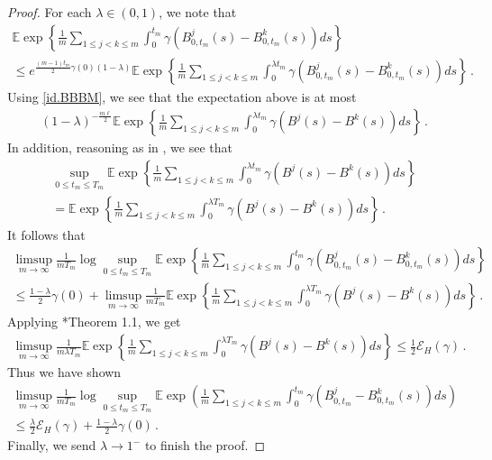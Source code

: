 \documentclass[12pt,reqno]{amsart}
\theoremstyle{remark}
\newcommand{\1}{\mathbf{1}}
\def\EE{\mathbb{E}}
\def\lt{\left}
\def\rt{\right}
\begin{document}
	\begin{proof}%
		For each $\lambda\in(0,1)$, we note that
		\begin{multline*}
			\EE \exp \left\{ \frac{1}{m} \sum_{1 \leq j < k \leq m} \int_0^{t_m} \gamma\left( B_{0, t_m}^j(s)-B_{0, t_m}^k(s) \right) ds \right\}
			\\\le
			e^{\frac{(m-1)t_m} 2\gamma(0)(1- \lambda)} \EE \exp \left\{ \frac{1}{m} \sum_{1 \leq j < k \leq m} \int_0^{\lambda t_m} \gamma\left( B_{0, t_m}^j(s)-B_{0, t_m}^k(s) \right) ds \right\}\,.
		\end{multline*}
		Using \eqref{id.BBBM}, we see that the expectation above is at most
		\begin{align*}
			(1- \lambda)^{-\frac{m\ell}2}\EE\exp\lt\{\frac1m\sum_{1\le j<k\le m}\int_0^{\lambda t_m}\gamma(B^j(s)-B^k(s))ds\rt\}\,.
		\end{align*}
		In addition, reasoning as in \cite[Lemma 4.1]{HLN15}, we see that
		\begin{multline*}
			\sup_{0 \leq t_m \leq T_m}\EE \exp \left\{ \frac{1}{m} \sum_{1 \leq j < k \leq m} \int_0^{\lambda t_m} \gamma\left( B^j(s)-B^k(s) \right) ds \right\}
			\\=\EE \exp \left\{ \frac{1}{m} \sum_{1 \leq j < k \leq m} \int_0^{\lambda T_m} \gamma\left( B^j(s)-B^k(s) \right) ds \right\}\,.
		\end{multline*}
		It follows that
		\begin{multline*}
			\limsup_{m\to\infty}\frac1{mT_m} \log \sup_{0 \leq t_m \leq T_m} \EE \exp \left\{ \frac{1}{m} \sum_{1 \leq j < k \leq m} \int_0^{t_m} \gamma\left( B_{0, t_m}^j(s)-B_{0, t_m}^k(s) \right) ds \right\}
			\\\le \frac{1- \lambda}2\gamma(0)+  \limsup_{m\to\infty}\frac1{mT_m}\EE\exp\lt\{\frac{1}{m} \sum_{1 \leq j < k \leq m} \int_0^{\lambda T_m} \gamma\left( B^j(s)-B^k(s) \right) ds \rt\}\,.
		\end{multline*}
		Applying \cite{ChPh15}*{Theorem 1.1}, we get 
		\begin{align*}
		\limsup_{m\to\infty}\frac1{m \lambda T_m}\EE\exp\lt\{\frac{1}{m} \sum_{1 \leq j < k \leq m} \int_0^{\lambda T_m} \gamma\left( B^j(s)-B^k(s) \right) ds \rt\}\leq \frac{1}{2} \mathcal{E}_H(\gamma)\,.
		\end{align*}
		Thus we have shown
		\begin{multline*}
		\limsup_{m \to \infty} \frac{1}{mT_m} \log \sup_{0 \leq t_m \leq T_m} \EE \exp \left( \frac{1}{m} \sum_{1 \leq j < k \leq m} \int_0^{t_m} \gamma\left( B_{0, t_m}^j-B_{0, t_m}^k(s) \right) ds \right) 
		\\\leq \frac{\lambda}{2} \mathcal{E}_H(\gamma) + \frac{1- \lambda}{2}\gamma(0)\,.
		\end{multline*}
		Finally, we send $\lambda \to 1^-$ to finish the proof. 
	\end{proof}
\end{document}
